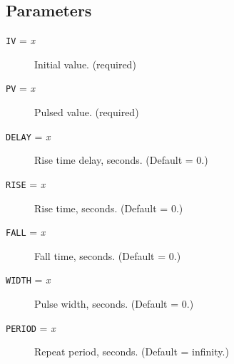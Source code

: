 \subsection{Parameters}

\begin{description}

\item[{\tt IV} = {\it x}] Initial value.  (required)

\item[{\tt PV} = {\it x}] Pulsed value.  (required)

\item[{\tt DELAY} = {\it x}] Rise time delay, seconds.  (Default = 0.)

\item[{\tt RISE} = {\it x}] Rise time, seconds.  (Default = 0.)

\item[{\tt FALL} = {\it x}] Fall time, seconds.  (Default = 0.)

\item[{\tt WIDTH} = {\it x}] Pulse width, seconds.  (Default = 0.)

\item[{\tt PERIOD} = {\it x}] Repeat period, seconds.  (Default = infinity.)

\end{description}
